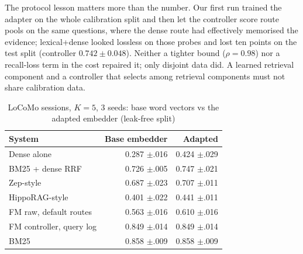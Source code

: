 \documentclass[journal]{IEEEtran}
\begin{document}
The protocol lesson matters more than the number. Our first run trained the adapter on the whole calibration split and then let the controller score route pools on the same questions, where the dense route had effectively memorised the evidence; lexical+dense looked lossless on those probes and lost ten points on the test split (controller $0.742 \pm 0.048$). Neither a tighter bound ($\rho = 0.98$) nor a recall-loss term in the cost repaired it; only disjoint data did. A learned retrieval component and a controller that selects among retrieval components must not share calibration data.

\begin{table}[t]
\caption{LoCoMo sessions, $K=5$, 3 seeds: base word vectors vs the adapted embedder (leak-free split)}
\label{tab:adapted}
\centering
\scriptsize
\begin{tabular}{lrr}
\toprule
System & Base embedder & Adapted \\
\midrule
Dense alone & 0.287 $\pm$.016 & 0.424 $\pm$.029 \\
BM25 + dense RRF & 0.726 $\pm$.005 & 0.747 $\pm$.021 \\
Zep-style & 0.687 $\pm$.023 & 0.707 $\pm$.011 \\
HippoRAG-style & 0.401 $\pm$.022 & 0.441 $\pm$.011 \\
FM raw, default routes & 0.563 $\pm$.016 & 0.610 $\pm$.016 \\
FM controller, query log & 0.849 $\pm$.014 & 0.849 $\pm$.014 \\
BM25 & 0.858 $\pm$.009 & 0.858 $\pm$.009 \\
\bottomrule
\end{tabular}
\end{table}
\end{document}
